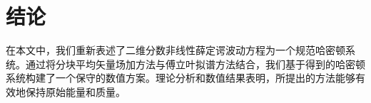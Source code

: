 \section{结论}\label{Section_PAVF: 5}

在本文中，我们重新表述了二维分数非线性薛定谔波动方程为一个规范哈密顿系统。通过将分块平均矢量场加方法与傅立叶拟谱方法结合，我们基于得到的哈密顿系统构建了一个保守的数值方案。理论分析和数值结果表明，所提出的方法能够有效地保持原始能量和质量。


	